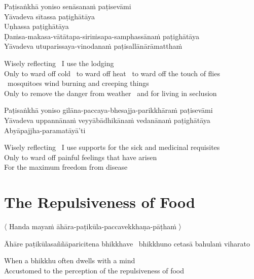 Paṭisaṅkhā yoniso senāsanaṁ paṭisevāmi\\
Yāvadeva sītassa paṭighātāya\\
Uṇhassa paṭighātāya\\
Ḍaṁsa-makasa-vātātapa-siriṁsapa-samphassānaṁ paṭighātāya\\
Yāvadeva utuparissaya-vinodanaṁ paṭisallānārāmatthaṁ

\begin{english-verses}
  Wisely reflecting \breathmark\ I use the lodging\\
  Only to ward off cold \breathmark\ to ward off heat \breathmark\ to ward off the touch of flies \breathmark\ mosquitoes wind burning and creeping things\\
  Only to remove the danger from weather \breathmark\ and for living in seclusion
\end{english-verses}

Paṭisaṅkhā yoniso gilāna-paccaya-bhesajja-parikkhāraṁ paṭisevāmi\\
Yāvadeva uppannānaṁ veyyābādhikānaṁ vedanānaṁ paṭighātāya\\
Abyāpajjha-paramatāyā'ti

\begin{english-verses}
  Wisely reflecting \breathmark\ I use supports for the sick and medicinal requisites\\
  Only to ward off painful feelings that have arisen\\
  For the maximum freedom from disease
\end{english-verses}

\suttaRef{[MN 2]}


\section{The Repulsiveness of Food}
\label{repulsiveness-of-food}

\begin{leader}
  〈 Handa mayaṁ āhāra-paṭikūla-paccavekkhaṇa-pāṭhaṁ 〉
\end{leader}

\begin{pali-hang}
Āhāre paṭikūlasaññāparicitena bhikkhave \breathmark\ bhikkhuno cetasā bahulaṁ viharato
\end{pali-hang}

\begin{english}
  When a bhikkhu often dwells with a mind\\
  Accustomed to the perception of the repulsiveness of food
\end{english}

